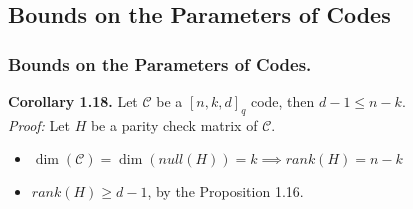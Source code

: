 \documentclass[10pt]{beamer}
\begin{document}
\subsection{Bounds on the Parameters of Codes}
\begin{frame}
  \frametitle{Bounds on the Parameters of Codes.}
  \textbf{Corollary 1.18.} Let $\mathcal{C}$ be a $[n, k, d]_{q}$ code, then $d - 1 \leq n - k$. \\
  \pause
  \textit{Proof:} Let $H$ be a parity check matrix of $\mathcal{C}$.
  \begin{itemize}
    \pause
    \item $\dim(\mathcal{C}) = \dim(null(H)) = k \implies rank(H) = n - k$
    \pause
    \item $rank(H) \geq d - 1$, by the Proposition 1.16.
  \end{itemize}
\end{frame}

\end{document}
